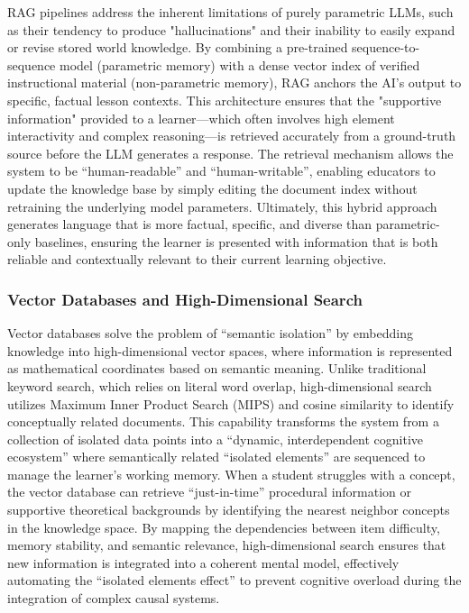 RAG pipelines address the inherent limitations of purely parametric LLMs, such as their tendency to produce "hallucinations" and their inability to easily expand or revise stored world knowledge. By combining a pre-trained sequence-to-sequence model (parametric memory) with a dense vector index of verified instructional material (non-parametric memory), RAG anchors the AI’s output to specific, factual lesson contexts. This architecture ensures that the "supportive information" provided to a learner—which often involves high element interactivity and complex reasoning—is retrieved accurately from a ground-truth source before the LLM generates a response. The retrieval mechanism allows the system to be ``human-readable'' and ``human-writable'', enabling educators to update the knowledge base by simply editing the document index without retraining the underlying model parameters. Ultimately, this hybrid approach generates language that is more factual, specific, and diverse than parametric-only baselines, ensuring the learner is presented with information that is both reliable and contextually relevant to their current learning objective\cite{lewis2020retrieval}.

\subsubsection{Vector Databases and High-Dimensional Search}
Vector databases solve the problem of ``semantic isolation'' by embedding knowledge into high-dimensional vector spaces, where information is represented as mathematical coordinates based on semantic meaning. Unlike traditional keyword search, which relies on literal word overlap, high-dimensional search utilizes Maximum Inner Product Search (MIPS) and cosine similarity to identify conceptually related documents. This capability transforms the system from a collection of isolated data points into a ``dynamic, interdependent cognitive ecosystem'' where semantically related ``isolated elements'' are sequenced to manage the learner's working memory. When a student struggles with a concept, the vector database can retrieve ``just-in-time'' procedural information or supportive theoretical backgrounds by identifying the nearest neighbor concepts in the knowledge space. By mapping the dependencies between item difficulty, memory stability, and semantic relevance, high-dimensional search ensures that new information is integrated into a coherent mental model, effectively automating the ``isolated elements effect'' to prevent cognitive overload during the integration of complex causal systems\cite{lewis2020retrieval, Cog2019Sweller, mayer2003}.
